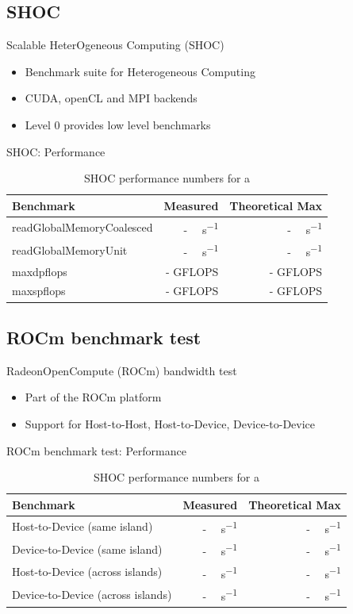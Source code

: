 \documentclass[aspectratio=169]{beamer}
\newcommand{\gbs}{\si[per-symbol = \text{~div~}]{\gibi\byte\per\second}}
\begin{document}
\subsection{SHOC}
\begin{frame}{Scalable HeterOgeneous Computing (SHOC)}
    \begin{itemize}
        \item Benchmark suite for Heterogeneous Computing
        \item CUDA, openCL and MPI backends
        \item Level 0 provides low level benchmarks
    \end{itemize}
\end{frame}

\begin{frame}{SHOC: Performance}
\begin{table}[]
    \centering
    \begin{tabular}{l|r|r}
Benchmark & Measured & Theoretical Max \\
\hline
readGlobalMemoryCoalesced &	- \gbs & - \gbs \\
readGlobalMemoryUnit      & - \gbs & - \gbs \\
\hline
maxdpflops                &  - GFLOPS    & - GFLOPS    \\
maxspflops                &  - GFLOPS    & - GFLOPS    \\ 
\hline
\end{tabular}
    \caption{SHOC performance numbers for a }
    \label{tab:SHOCnumbers}
\end{table}
\end{frame}

\subsection{ROCm benchmark test}
\begin{frame}{RadeonOpenCompute (ROCm) bandwidth test}
    \begin{itemize}
        \item Part of the ROCm platform
        \item Support for Host-to-Host, Host-to-Device, Device-to-Device
    \end{itemize}
\end{frame}

\begin{frame}{ROCm benchmark test: Performance}
\begin{table}[]
    \centering
    \begin{tabular}{l|r|r}
Benchmark & Measured & Theoretical Max \\
\hline
Host-to-Device (same island)      & - \gbs & - \gbs \\
Device-to-Device (same island)    & - \gbs & - \gbs \\
\hline
Host-to-Device (across islands)      & - \gbs & - \gbs \\
Device-to-Device (across islands) & - \gbs & - \gbs \\
\hline
\end{tabular}
    \caption{SHOC performance numbers for a }
    \label{tab:ROCmnumbers}
\end{table}
\end{frame}
\end{document}
